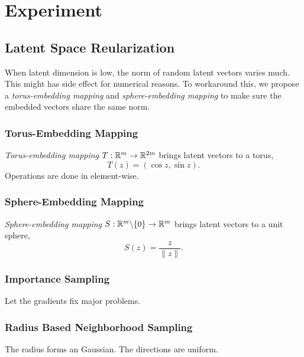 \section{Experiment}\label{sec:exp}

\subsection{Latent Space Reularization}

When latent dimension is low,
the norm of random latent vectors varies much.
This might has side effect for numerical reasons.
To workaround this,
we propose a \emph{torus-embedding mapping} and \emph{sphere-embedding mapping}
to make sure the embedded vectors share the same norm.

\subsubsection{Torus-Embedding Mapping}

\emph{Torus-embedding mapping} \(T:{\mathbb{R}}^m\to{\mathbb{R}}^{2m}\) brings latent vectors to a torus,
\begin{equation}
    T(z) = (\cos z, \sin z).
\end{equation}
Operations are done in element-wise.

\subsubsection{Sphere-Embedding Mapping}

\emph{Sphere-embedding mapping} \(S:{\mathbb{R}}^m\backslash\{0\}\to{\mathbb{R}}^{m}\) brings latent vectors to a unit sphere,
\begin{equation}
    S(z) = \frac{z}{\|z\|}.
\end{equation}

\subsubsection{Importance Sampling}

Let the gradients fix major problems.

\subsubsection{Radius Based Neighborhood Sampling}

The radius forms an Gaussian.
The directions are uniform.
